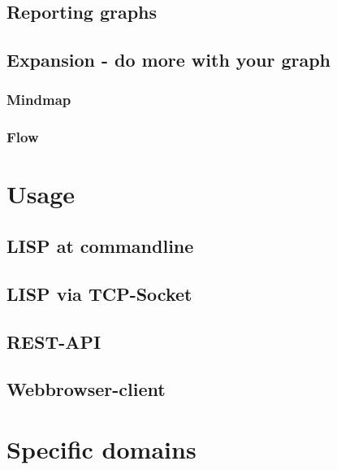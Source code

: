 \documentclass[a4paper, 12pt]{scrbook}
\begin{document}
\section{Reporting graphs}
\section{Expansion - do more with your graph}
\subsection{Mindmap}
\subsection{Flow}
\chapter{Usage}
\section{LISP at commandline}
\section{LISP via TCP-Socket}
\section{REST-API}
\section{Webbrowser-client}
\chapter{Specific domains}

\clearpage %

% 
\printindex


\end{document}
